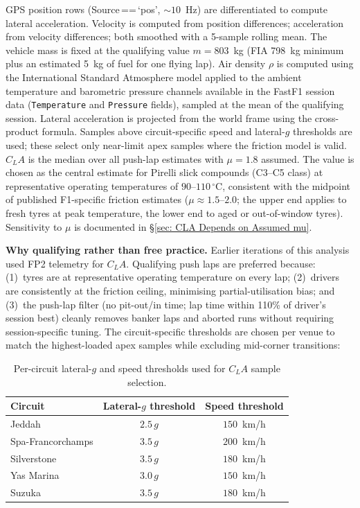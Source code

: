 GPS position rows (Source\,==\,`pos', $\sim\!10$~Hz) are differentiated to compute lateral acceleration. Velocity is computed from position differences; acceleration from velocity differences; both smoothed with a 5-sample rolling mean. The vehicle mass is fixed at the qualifying value $m = 803$~kg (FIA 798~kg minimum plus an estimated 5~kg of fuel for one flying lap). Air density $\rho$ is computed using the International Standard Atmosphere model applied to the ambient temperature and barometric pressure channels available in the FastF1 session data (\texttt{Temperature} and \texttt{Pressure} fields), sampled at the mean of the qualifying session. Lateral acceleration is projected from the world frame using the cross-product formula. Samples above circuit-specific speed and lateral-$g$ thresholds are used; these select only near-limit apex samples where the friction model is valid. $C_LA$ is the median over all push-lap estimates with $\mu = 1.8$ assumed. The value is chosen as the central estimate for Pirelli slick compounds (C3--C5 class) at representative operating temperatures of $90$--$110\,^\circ$C, consistent with the midpoint of published F1-specific friction estimates ($\mu \approx 1.5$--$2.0$; the upper end applies to fresh tyres at peak temperature, the lower end to aged or out-of-window tyres). Sensitivity to $\mu$ is documented in \S\ref{sec: CLA Depends on Assumed mu}.

\textbf{Why qualifying rather than free practice.} Earlier iterations of this analysis used FP2 telemetry for $C_LA$. Qualifying push laps are preferred because: (1)~tyres are at representative operating temperature on every lap; (2)~drivers are consistently at the friction ceiling, minimising partial-utilisation bias; and (3)~the push-lap filter (no pit-out/in time; lap time within 110\% of driver's session best) cleanly removes banker laps and aborted runs without requiring session-specific tuning. The circuit-specific thresholds are chosen per venue to match the highest-loaded apex samples while excluding mid-corner transitions:

\begin{table}[h]
    \centering
        \caption{Per-circuit lateral-$g$ and speed thresholds used for $C_LA$ sample selection.}
    	\label{tab: cla thresholds}
	\begin{tabular}{lcc}
        \toprule
        Circuit & Lateral-$g$ threshold & Speed threshold \\
        \midrule
        Jeddah            & $2.5\,g$ & $150$~km/h \\
        Spa-Francorchamps & $3.5\,g$ & $200$~km/h \\
        Silverstone       & $3.5\,g$ & $180$~km/h \\
        Yas Marina        & $3.0\,g$ & $150$~km/h \\
        Suzuka            & $3.5\,g$ & $180$~km/h \\
        \bottomrule
    \end{tabular}
\end{table}

